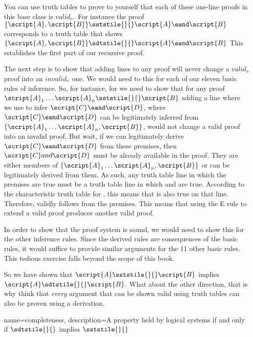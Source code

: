 You can use truth tables to prove to yourself that each of these one-line proofs in this base class is $valid_{\models}$. For instance the proof $\{\script{A}, \script{B}\} \sststile{}{} \script{A} \eand \script{B}$ corresponds to a truth table that shows $\{\script{A}, \script{B}\} \sdtstile{}{} \script{A} \eand \script{B}$ This establishes the first part of our recursive proof. 

The next step is to show that adding lines to any proof will never change a $valid_{\models}$ proof into an $invalid_{\models}$ one. We would need to this for each of our eleven basic rules of inference. So, for instance, for  we need to show that for any proof $\script{A}_{1} \ldots{} \script{A}_{n} \sststile{}{} \script {B}$ adding a line where we use  to infer $\script{C} \eand \script{D}$, where $\script{C} \eand \script{D}$ can be legitimately inferred from $\{\script{A}_{1} \ldots{} \script{A}_{n}, \script {B}\}$, would not change a valid proof into an invalid proof. But wait, if we can legitimately derive $\script{C} \eand \script{D}$ from these premises, then $\script{C} and \script{D}$ must be already available in the proof. They are either members of  $\{\script{A}_{1} \ldots{} \script{A}_{n}, \script {B}\}$ or can be legitimately derived from them. As such, any truth table line in which the premises are true must be a truth table line in which  and  are true. According to the characteristic truth table for \eand, this means that \eand{} is also true on that line. Therefore, \eand{} validly follows from the premises. This means that using the {\eand}E rule to extend a valid proof produces another valid proof.

In order to show that the proof system is sound, we would need to show this for the other inference rules. Since the derived rules are consequences of the basic rules, it would suffice to provide similar arguments for the 11 other basic rules. This tedious exercise falls beyond the scope of this book.

So we have shown that $\script{A} \sststile{}{} \script{B}$ implies $\script{A} \sdtstile{}{}\script{B}.$ What about the other direction, that is why think that \emph{every} argument that can be shown valid using truth tables can also be proven using a derivation. 

{
name=completeness,
description={A property held by logical systems if and only if $\sdtstile{}{}$ implies $\sststile{}{}$}
}

